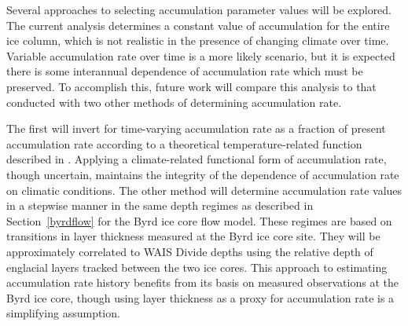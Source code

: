 \documentclass[12pt]{article}
\begin{document}
Several approaches to selecting accumulation parameter values will be explored. The current analysis determines a constant value of accumulation for the entire ice column, which is not realistic in the presence of changing climate over time. Variable accumulation rate over time is a more likely scenario, but it is expected there is some interannual dependence of accumulation rate which must be preserved. To accomplish this, future work will compare this analysis to that conducted with two other methods of determining accumulation rate. 

The first will invert for time-varying accumulation rate as a fraction of present accumulation rate according to a theoretical temperature-related function described in \citet{morse2002}. Applying a climate-related functional form of accumulation rate, though uncertain, maintains the integrity of the dependence of accumulation rate on climatic conditions. The other method will determine accumulation rate values in a stepwise manner in the same depth regimes as described in Section~\ref{byrdflow} for the Byrd ice core flow model. These regimes are based on transitions in layer thickness measured at the Byrd ice core site. They will be approximately correlated to WAIS Divide depths using the relative depth of englacial layers tracked between the two ice cores. This approach to estimating accumulation rate history benefits from its basis on measured observations at the Byrd ice core, though using layer thickness as a proxy for accumulation rate is a simplifying assumption.
\end{document}
